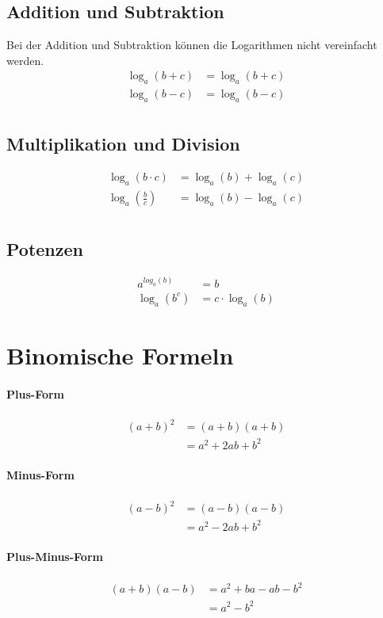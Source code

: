 \subsection{Addition und Subtraktion}
Bei der Addition und Subtraktion können die Logarithmen nicht vereinfacht werden.
\begin{align*}
	\log_a(b + c) &= \log_a(b + c) \\
	\log_a(b - c) &= \log_a(b - c) \\
\end{align*}

\subsection{Multiplikation und Division}
\begin{align*}
	\log_a(b \cdot c) &= \log_a(b) + \log_a(c) \\
	\log_a\left(\frac{b}{c}\right) &= \log_a(b) - \log_a(c) \\
\end{align*}


\subsection{Potenzen}
\begin{align*}
a^{log_a(b)} &= b \\
\log_a(b^c) &= c \cdot \log_a(b)
\end{align*}


\section{Binomische Formeln}
\paragraph{Plus-Form}
\begin{align*}
(a + b)^2 &= (a + b) (a + b) \\
		  &= a^2 + 2ab + b^2
\end{align*}

\paragraph{Minus-Form}
\begin{align*}
(a - b)^2 &= (a - b)(a - b) \\
		  &= a^2 - 2ab + b^2
\end{align*}


\paragraph{Plus-Minus-Form}
\begin{align*}
(a+b)(a-b) &= a^2 + ba - ab - b^2 \\
		   &= a^2 - b^2
\end{align*}

